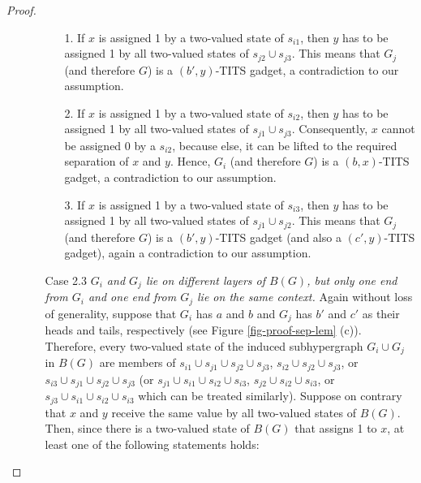 \documentclass[%
12pt,
prereprint,
showpacs,
showkeys,
preprintnumbers,
amsmath,amssymb,
aps,
pra,
longbibliography,
notitlepage
]{revtex4-1}
\theoremstyle{definition}
\begin{document}
\begin{proof}
\begin{itemize}
\begin{itemize}
                                        \begin{itemize}
                                                \item[1.] If $x$ is assigned 1 by a two-valued state of $s_{i1}$, then $y$ has to be assigned 1 by all two-valued states of $s_{j2}\cup s_{j3}$. This means that $G_j$ (and therefore $G$) is a $(b',y)$-TITS gadget, a contradiction to our assumption.
                                                \item[2.] If $x$ is assigned 1 by a two-valued state of $s_{i2}$, then $y$ has to be assigned 1 by all two-valued states of $s_{j1}\cup s_{j3}$. Consequently, $x$ cannot be assigned 0 by a $s_{i2}$, because else, it can be lifted to the required separation of $x$ and $y$. Hence, $G_i$ (and therefore $G$) is a $(b,x)$-TITS gadget, a contradiction to our assumption.
                                                \item[3.] If $x$ is assigned 1 by a two-valued state of $s_{i3}$, then $y$ has to be assigned 1 by all two-valued states of $s_{j1}\cup s_{j2}$. This means that $G_j$ (and therefore $G$) is a $(b',y)$-TITS gadget (and also a $(c',y)$-TITS gadget), again a contradiction to our assumption.
                                        \end{itemize}
                                \item[Case 2.3] \emph{$G_i$ and $G_j$ lie on different layers of $B(G)$, but only one end from $G_i$ and one end from $G_j$ lie on the same context.} Again without loss of generality, suppose that $G_i$ has $a$ and $b$ and $G_j$ has $b'$ and $c'$ as their heads and tails, respectively (see Figure \ref{fig-proof-sep-lem} (c)). Therefore, every two-valued state of the induced subhypergraph $G_i \cup G_j$ in $B(G)$ are members of $s_{i1} \cup s_{j1}\cup s_{j2}\cup s_{j3}$, $s_{i2} \cup s_{j2}\cup s_{j3}$, or $s_{i3}\cup s_{j1}\cup s_{j2} \cup s_{j3}$ (or $s_{j1} \cup s_{i1}\cup s_{i2}\cup s_{i3}$, $s_{j2} \cup s_{i2}\cup s_{i3}$, or $s_{j3}\cup s_{i1}\cup s_{i2} \cup s_{i3}$ which can be treated similarly). Suppose on contrary that $x$ and $y$ receive the same value by all two-valued states of $B(G)$. Then, since there is a two-valued state of $B(G)$ that assigns 1 to $x$, at least one of the following statements holds:


\end{itemize}
\end{itemize}
\end{proof}
\end{document}

